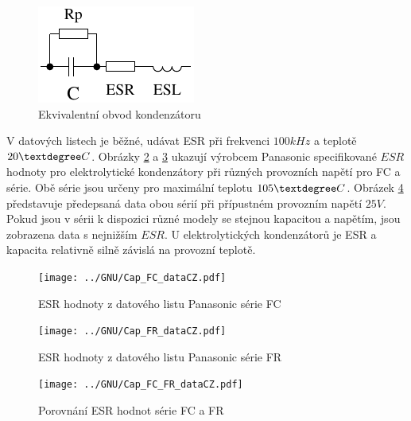 \begin{figure}[H]
  \centering
    \includegraphics[width=.3\textwidth]{../FIG/Cap_equiv.pdf}
  \caption{Ekvivalentní obvod kondenzátoru}
  \label{fig:Cap_equiv}
\end{figure}

V datových listech je běžné, udávat ESR při frekvenci \(100kHz\) a teplotě \(20\textdegree C\).
Obrázky \ref{fig:Cap_FC_data} a \ref{fig:Cap_FR_data} ukazují výrobcem Panasonic
specifikované  \(ESR\) hodnoty pro elektrolytické kondenzátory při různých provozních napětí pro FC 
a  série. 
Obě série jsou určeny pro maximální teplotu \(105\textdegree C\).
Obrázek \ref{fig:Cap_FC_FR_data} představuje předepsaná data obou sérií při přípustném provozním napětí \(25V\). Pokud jsou v sérii k dispozici různé modely se stejnou kapacitou a napětím,
jsou zobrazena data s nejnižším \(ESR\).
U elektrolytických kondenzátorů je ESR a kapacita relativně silně závislá na provozní teplotě.

\begin{figure}[H]
  \centering
  \texttt{[image: ../GNU/Cap\_FC\_dataCZ.pdf]}
  \caption{ESR hodnoty z datového listu Panasonic série FC}
  \label{fig:Cap_FC_data}
\end{figure}

\begin{figure}[H]
  \centering
  \texttt{[image: ../GNU/Cap\_FR\_dataCZ.pdf]}
  \caption{ESR hodnoty z datového listu Panasonic série FR}
  \label{fig:Cap_FR_data}
\end{figure}

\begin{figure}[H]
  \centering
  \texttt{[image: ../GNU/Cap\_FC\_FR\_dataCZ.pdf]}
  \caption{Porovnání ESR hodnot série FC a FR}
  \label{fig:Cap_FC_FR_data}
\end{figure}

